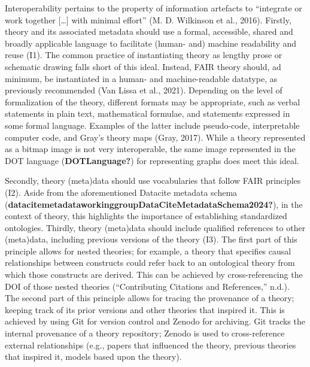 \documentclass[
  man,floatsintext]{apa6}
\begin{document}
Interoperability pertains to the property of information artefacts to ``integrate or work together {[}\ldots{]} with minimal effort'' (M. D. Wilkinson et al., 2016).
Firstly, theory and its associated metadata should use a formal, accessible, shared and broadly applicable language to facilitate (human- and) machine readability and reuse (I1).
The common practice of instantiating theory as lengthy prose or schematic drawing falls short of this ideal.
Instead, FAIR theory should, ad minimum,
be instantiated in a human- and machine-readable datatype,
as previously recommended (Van Lissa et al., 2021).
Depending on the level of formalization of the theory,
different formats may be appropriate,
such as verbal statements in plain text,
mathematical formulae,
and statements expressed in some formal language.
Examples of the latter include pseudo-code,
interpretable computer code,
and Gray's theory maps (Gray, 2017).
While a theory represented as a bitmap image is not very interoperable,
the same image represented in the DOT language (\textbf{DOTLanguage?}) for representing graphs does meet this ideal.

Secondly, theory (meta)data should use vocabularies that follow FAIR principles (I2).
Aside from the aforementioned Datacite metadata schema (\textbf{datacitemetadataworkinggroupDataCiteMetadataSchema2024?}),
in the context of theory, this highlights the importance of establishing standardized ontologies.
Thirdly, theory (meta)data should include qualified references to other (meta)data, including previous versions of the theory (I3).
The first part of this principle allows for nested theories;
for example, a theory that specifies causal relationships between constructs could refer back to an ontological theory from which those constructs are derived.
This can be achieved by cross-referencing the DOI of those nested theories ({``Contributing {Citations} and {References},''} n.d.).
The second part of this principle allows for tracing the provenance of a theory; keeping track of its prior versions and other theories that inspired it.
This is achieved by using Git for version control and Zenodo for archiving.
Git tracks the internal provenance of a theory repository; Zenodo is used to cross-reference external relationships (e.g., papers that influenced the theory, previous theories that inspired it, models based upon the theory).
\end{document}
